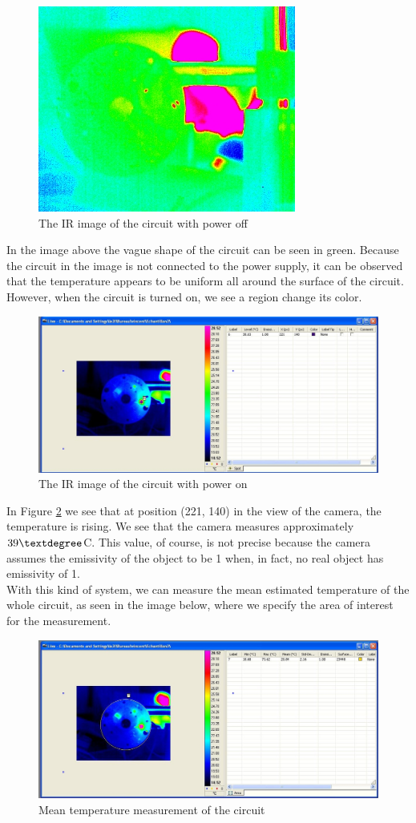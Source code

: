 \documentclass[english]{article}
\begin{document}
\begin{figure}[H]
	\centering
	\includegraphics[width=0.3\linewidth]{Pictures/circuit_cold001.JPG}
	\caption{The IR image of the circuit with power off}
	\label{fig:one}
\end{figure}
In the image above the vague shape of the circuit can be seen in green. 
Because the circuit in the image is not connected to the power supply, it can be observed that the temperature appears to be uniform all around the surface of the circuit.\\
However, when the circuit is turned on, we see a region change its color.\\
\begin{figure}[H]
	\centering
	\includegraphics[width=1\linewidth]{Pictures/position1.JPG}
	\caption{The IR image of the circuit with power on}
	\label{fig:two}
\end{figure}
In Figure \ref{fig:two} we see that at position (221, 140) in the view of the camera, the temperature is rising.
We see that the camera measures approximately $39 \textdegree$C.
This value, of course, is not precise because the camera assumes the emissivity of the object to be 1 when, in fact, no real object has emissivity of 1.\\
With this kind of system, we can measure the mean estimated temperature of the whole circuit, as seen in the image below, where we specify the area of interest for the measurement.\\
\begin{figure}[H]
	\centering
	\includegraphics[width=1\linewidth]{Pictures/max1.JPG}
	\caption{Mean temperature measurement of the circuit}
	\label{fig:three}
\end{figure}
\end{document}
